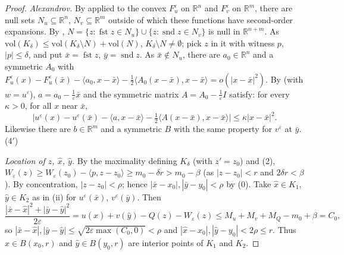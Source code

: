 \begin{proof}
\emph{Alexandrov.} By  applied to the convex $F_u^\varepsilon$ on $\mathbb R^n$ and $F_v^\varepsilon$ on $\mathbb R^m$, there are null sets $N_u\subseteq\mathbb R^n$, $N_v\subseteq\mathbb R^m$ outside of which these functions have second-order expansions. By , $N=\{z:\operatorname{fst}z\in N_u\}\cup\{z:\operatorname{snd}z\in N_v\}$ is null in $\mathbb R^{n+m}$. As $\mathrm{vol}(K_\delta)\le\mathrm{vol}(K_\delta\setminus N)+\mathrm{vol}(N)$, $K_\delta\setminus N\ne\emptyset$; pick $z$ in it with witness $p$, $|p|\le\delta$, and put $\bar x=\operatorname{fst}z$, $\bar y=\operatorname{snd}z$. As $\bar x\notin N_u$, there are $a_0\in\mathbb R^n$ and a symmetric $A_0$ with $F_u^\varepsilon(x)-F_u^\varepsilon(\bar x)-\langle a_0,x-\bar x\rangle-\frac12\langle A_0(x-\bar x),x-\bar x\rangle=o(|x-\bar x|^2)$. By  (with $w=u^\varepsilon$), $a=a_0-\frac1\varepsilon\bar x$ and the symmetric matrix $A=A_0-\frac1\varepsilon I$ satisfy: for every $\kappa>0$, for all $x$ near $\bar x$,
\[
\bigl|u^\varepsilon(x)-u^\varepsilon(\bar x)-\langle a,x-\bar x\rangle-\tfrac12\langle A(x-\bar x),x-\bar x\rangle\bigr|\le\kappa|x-\bar x|^2 . \tag{4}
\]
Likewise there are $b\in\mathbb R^m$ and a symmetric $B$ with the same property for $v^\varepsilon$ at $\bar y$. \hfill(4$'$)

\emph{Location of $z$, $\hat x$, $\hat y$.} By the maximality defining $K_\delta$ (with $z'=z_0$) and (2), $W_\varepsilon(z)\ge W_\varepsilon(z_0)-\langle p,z-z_0\rangle\ge m_0-\delta r>m_0-\beta$ (as $|z-z_0|<r$ and $2\delta r<\beta$). By concentration, $|z-z_0|<\rho$; hence $|\bar x-x_0|,|\bar y-y_0|<\rho$ by (0). Take $\hat x\in K_1$, $\hat y\in K_2$ as in (ii) for $u^\varepsilon(\bar x)$, $v^\varepsilon(\bar y)$. Then
\[
\frac{|\bar x-\hat x|^2+|\bar y-\hat y|^2}{2\varepsilon}=u(\hat x)+v(\hat y)-Q(z)-W_\varepsilon(z)\le M_u+M_v+M_Q-m_0+\beta=C_0 ,
\]
so $|\bar x-\hat x|,|\bar y-\hat y|\le\sqrt{2\varepsilon\max(C_0,0)}<\rho$ and $|\hat x-x_0|,|\hat y-y_0|<2\rho\le r$. Thus $\hat x\in B(x_0,r)$ and $\hat y\in B(y_0,r)$ are interior points of $K_1$ and $K_2$.


\end{proof}
